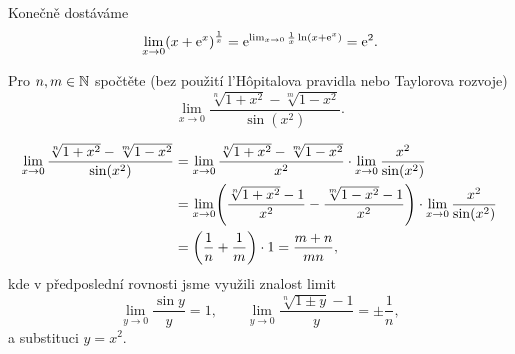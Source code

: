\documentclass[answers]{exam}
\begin{document}
\begin{questions}
\begin{solution}
  Konečně dostáváme
  \begin{equation*}
    \lim_{x \to 0} \parens{x + \exponential{x}}^{\frac{1}{x}}
    =
    \exponential{\lim_{x \to 0} \frac{1}{x} \ln \parens{x + \exponential{x}}}
    =
    \exponential{2}.
  \end{equation*}
  \end{solution}
  
  \question[2] Pro $n, m \in \mathbb{N}$ spočtěte (bez použití l'Hôpitalova pravidla nebo Taylorova rozvoje)
  \begin{equation*}
    \lim_{x \to 0} 
    \frac{
      \sqrt[n]{1 + x^2} - \sqrt[m]{1 - x^2}
    }{
      \sin(x^2)
    }.
  \end{equation*}
  
  \begin{solution}
    \begin{align*}
      \lim_{x \to 0} 
      \frac{
        \sqrt[n]{1 + x^2} - \sqrt[m]{1 - x^2}
      }{
        \sin(x^2)
      }
      &=
      \lim_{x \to 0}
      \frac{\sqrt[n]{1 + x^2} - \sqrt[m]{1 - x^2}}{x^2}
      \cdot
      \lim_{x \to 0}
      \frac{x^2}{\sin(x^2)} 
      \\
      &=
      \lim_{x \to 0}
      \parens{\frac{\sqrt[n]{1 + x^2} - 1}{x^2} - \frac{\sqrt[m]{1 - x^2} - 1}{x^2}}
      \cdot
      \lim_{x \to 0}
      \frac{x^2}{\sin(x^2)} 
      \\
      &=
      \parens{\frac{1}{n} + \frac{1}{m}} \cdot 1
      =
      \frac{m + n}{mn},
    \end{align*}
    kde v předposlední rovnosti jsme využili znalost limit
    \begin{equation*}
      \lim_{y \to 0} \frac{\sin y}{y} = 1,
      \qquad
      \lim_{y \to 0} \frac{\sqrt[n]{1 \pm y} - 1}{y} = \pm \frac{1}{n},
    \end{equation*}
    a substituci $y = x^2$.
    
  \end{solution}
   
\end{questions}
\end{document}
